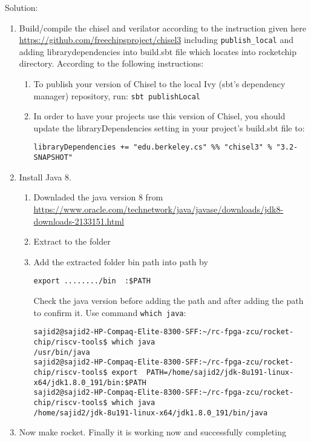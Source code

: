 \documentclass[a4paper,11pt]{article}
\begin{document}
Solution:
\begin{enumerate}
\item   Build/compile the chisel and verilator according to the instruction given here \url{https://github.com/freechipsproject/chisel3} including {\tt publish\_local} and adding librarydependencies into build.sbt file which locates into rocketchip directory.
     According to the following instructions:\\
     \begin{enumerate}
     \item To publish your version of Chisel to the local Ivy (sbt's dependency manager) repository, run:
     {\tt sbt publishLocal}
     \item In order to have your projects use this version of Chisel, you should update the libraryDependencies setting in your project's build.sbt file to:
     \begin{verbatim}
libraryDependencies += "edu.berkeley.cs" %% "chisel3" % "3.2-SNAPSHOT"
     \end{verbatim}
     \end{enumerate}
\item Install Java 8.
\begin{enumerate}
\item Downladed the java version 8 from \url{https://www.oracle.com/technetwork/java/javase/downloads/jdk8-downloads-2133151.html}
\item Extract to the folder
\item Add the extracted folder bin path into path by 
\begin{verbatim}export ......../bin  :$PATH
\end{verbatim}
Check the java version before adding the path and after adding the path to confirm it. Use command {\tt which java}:
\begin{lstlisting}
sajid2@sajid2-HP-Compaq-Elite-8300-SFF:~/rc-fpga-zcu/rocket-chip/riscv-tools$ which java
/usr/bin/java
sajid2@sajid2-HP-Compaq-Elite-8300-SFF:~/rc-fpga-zcu/rocket-chip/riscv-tools$ export  PATH=/home/sajid2/jdk-8u191-linux-x64/jdk1.8.0_191/bin:$PATH
sajid2@sajid2-HP-Compaq-Elite-8300-SFF:~/rc-fpga-zcu/rocket-chip/riscv-tools$ which java
/home/sajid2/jdk-8u191-linux-x64/jdk1.8.0_191/bin/java
\end{lstlisting}
\end{enumerate}
\item Now make rocket. Finally it is working now and successfully completing
\end{enumerate}
\end{document}
